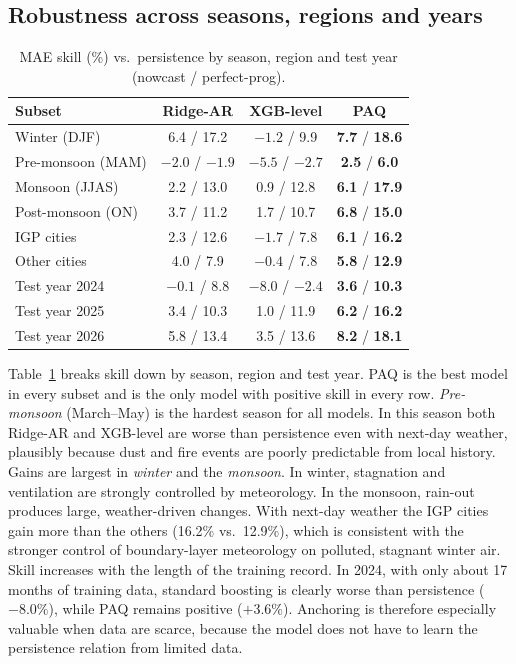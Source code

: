 \documentclass[conference]{IEEEtran}
\begin{document}
\subsection{Robustness across seasons, regions and years}
\begin{table}[t]
\centering
\caption{MAE skill (\%) vs.\ persistence by season, region and test year (nowcast / perfect-prog).}
\label{tab:robust}
\setlength{\tabcolsep}{3pt}
\begin{tabular}{lccc}
\toprule
Subset & Ridge-AR & XGB-level & PAQ \\
\midrule
Winter (DJF)        & 6.4 / 17.2 & $-1.2$ / 9.9 & \textbf{7.7} / \textbf{18.6} \\
Pre-monsoon (MAM)   & $-2.0$ / $-1.9$ & $-5.5$ / $-2.7$ & \textbf{2.5} / \textbf{6.0} \\
Monsoon (JJAS)      & 2.2 / 13.0 & 0.9 / 12.8 & \textbf{6.1} / \textbf{17.9} \\
Post-monsoon (ON)   & 3.7 / 11.2 & 1.7 / 10.7 & \textbf{6.8} / \textbf{15.0} \\
\midrule
IGP cities          & 2.3 / 12.6 & $-1.7$ / 7.8 & \textbf{6.1} / \textbf{16.2} \\
Other cities        & 4.0 / 7.9 & $-0.4$ / 7.8 & \textbf{5.8} / \textbf{12.9} \\
\midrule
Test year 2024      & $-0.1$ / 8.8 & $-8.0$ / $-2.4$ & \textbf{3.6} / \textbf{10.3} \\
Test year 2025      & 3.4 / 10.3 & 1.0 / 11.9 & \textbf{6.2} / \textbf{16.2} \\
Test year 2026      & 5.8 / 13.4 & 3.5 / 13.6 & \textbf{8.2} / \textbf{18.1} \\
\bottomrule
\end{tabular}
\end{table}

Table~\ref{tab:robust} breaks skill down by season, region and test year. PAQ is the best model
in every subset and is the only model with positive skill in every row.
\emph{Pre-monsoon} (March--May) is the hardest season for all models. In this season both Ridge-AR
and XGB-level are worse than persistence even with next-day weather, plausibly because
dust and fire events are poorly predictable from local history. Gains are largest in
\emph{winter} and the \emph{monsoon}. In winter, stagnation and ventilation are strongly
controlled by meteorology. In the monsoon, rain-out produces large, weather-driven changes.
With next-day weather the IGP cities gain more than the others (16.2\% vs.\ 12.9\%), which is
consistent with the stronger control of boundary-layer meteorology on polluted, stagnant
winter air. Skill increases with the length of the training record. In 2024, with only
about 17 months of training data, standard boosting is clearly worse than persistence ($-8.0\%$),
while PAQ remains positive ($+3.6\%$). Anchoring is therefore especially valuable when data are scarce,
because the model does not have to learn the persistence relation from limited data.
\end{document}
